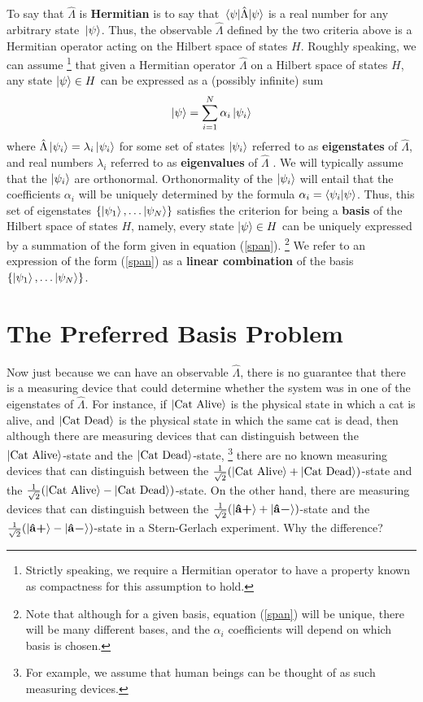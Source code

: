 \documentclass[letter, 12pt]{turabian-thesis}
\theoremstyle{hypothesis}
\newcommand{\uvb}[1]{\vb{\hat{{#1}}}}
\newcommand{\uvbp}[1]{\uvb{#1}\bm{+}}
\newcommand{\uvbm}[1]{\uvb{#1}\bm{-}}
\let\origfootnote\footnote %
\renewcommand{\footnote}[1]{%
\noindent %
\origfootnote{#1}}
\begin{document}
To say that $\hat{\Lambda}$ is \textbf{Hermitian} is to say that $\ev*{\hat{\Lambda}}{\psi}$ is a real number for any arbitrary state $\ket*{\psi}$. Thus, the observable $\hat{\Lambda}$ defined by the two criteria above is a Hermitian operator acting on the Hilbert space of states $H$. Roughly speaking, we can assume\footnote{Strictly speaking, we require a Hermitian operator to have a property known as compactness for this assumption to hold.}  that given a Hermitian operator $\hat{\Lambda}$ on a Hilbert space of states $H$, any state $\ket{\psi}\in H$ can be expressed as a (possibly infinite) sum 
\begin{equation}\label{span}
\ket{\psi}=\sum_{i=1}^N\alpha_i\ket{\psi_i}
\end{equation}
 where $\hat{\Lambda}\ket{\psi_i}=\lambda_i\ket{\psi_i}$ for some set of states $\ket{\psi_i}$ referred to as \textbf{eigenstates} of $\hat{\Lambda}$, and real numbers $\lambda_i$ referred to as \textbf{eigenvalues} of $\hat{\Lambda}$ . We will typically assume that the $\ket{\psi_i}$ are orthonormal. Orthonormality of the $\ket{\psi_i}$ will entail that the coefficients $\alpha_i$ will be uniquely determined by the formula $\alpha_i=\ip{\psi_i}{\psi}$. Thus, this set of eigenstates $\{\ket{\psi_1},\ldots\ket{\psi_N}\}$ satisfies the criterion for being a \textbf{basis} of the Hilbert space of states $H$, namely, every state $\ket{\psi}\in H$ can be uniquely expressed by a summation of the form given in equation (\ref{span}).\footnote{Note that although for a given basis, equation (\ref{span}) will be unique, there will be many different bases, and the $\alpha_i$ coefficients will depend on which basis is chosen.} We refer to an expression of the form (\ref{span}) as a \textbf{linear combination} of the basis $\{\ket{\psi_1},\ldots\ket{\psi_N}\}$. 

\section{The Preferred Basis Problem\protect\footnotemark}
Now just because we can have an observable $\hat{\Lambda}$, there is no guarantee that there is a measuring device that could determine whether the system was in one of the eigenstates of $\hat{\Lambda}$. For instance, if $\ket{\text{Cat Alive}}$ is the physical state in which a cat is alive, and $\ket{\text{Cat Dead}}$ is the physical state in which the same cat is dead, then although there are measuring devices that can distinguish between the $\ket{\text{Cat Alive}}$-state and the $\ket{\text{Cat Dead}}$-state,\footnote{For example, we assume that human beings can be thought of as such measuring devices.} there are no known measuring devices that can distinguish between the $\frac{1}{\sqrt{2}}(\ket{\text{Cat Alive}}+\ket{\text{Cat Dead}})$-state and the $\frac{1}{\sqrt{2}}(\ket{\text{Cat Alive}}-\ket{\text{Cat Dead}})$-state. On the other hand, there are measuring devices that can distinguish between the $\frac{1}{\sqrt{2}}(\ket{\uvbp{a}}+\ket{\uvbm{a}})$-state and the $\frac{1}{\sqrt{2}}(\ket{\uvbp{a}}-\ket{\uvbm{a}})$-state in a Stern-Gerlach experiment. Why the difference?
\end{document}
